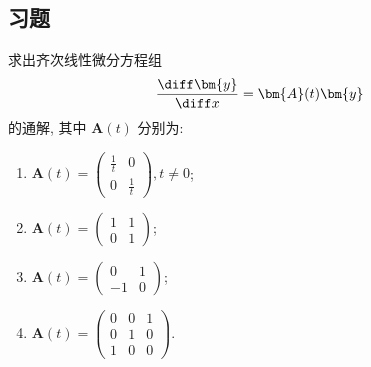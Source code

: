 \subsection{习题}



\begin{exercise}
  求出齐次线性微分方程组
  \[\frac{\diff\bm{y}}{\diff x}=\bm{A}(t)\bm{y}\]
  的通解, 其中 $\bm{A}(t)$ 分别为:
  \begin{enumerate}[(1)]
  \item $\displaystyle\bm{A}(t)=\begin{pmatrix}\frac{1}{t}&0\\0&\frac{1}{t}\end{pmatrix},t\neq0$;
  \item $\displaystyle\bm{A}(t)=\begin{pmatrix}1&1\\0&1\end{pmatrix}$;
  \item $\displaystyle\bm{A}(t)=\begin{pmatrix}0&1\\-1&0\end{pmatrix}$;
  \item $\displaystyle\bm{A}(t)=\begin{pmatrix}0&0&1\\0&1&0\\1&0&0\end{pmatrix}$.
  \end{enumerate}
\end{exercise}

